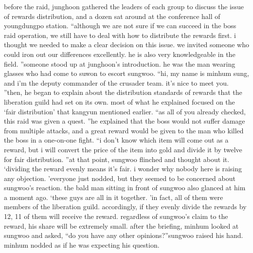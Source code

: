 before the raid, junghoon gathered the leaders of each group to discuss the issue of rewards distribution, and a dozen sat around at the conference hall of youngdungpo station.
“although we are not sure if we can succeed in the boss raid operation, we still have to deal with how to distribute the rewards first.
 i thought we needed to make a clear decision on this issue.
 we invited someone who could iron out our differences excellently.
 he is also very knowledgeable in the field.
”someone stood up at junghoon’s introduction.
 he was the man wearing glasses who had come to suwon to escort sungwoo.
“hi, my name is minhum sung, and i’m the deputy commander of the crusader team.
 it’s nice to meet you.
”then, he began to explain about the distribution standards of rewards that the liberation guild had set on its own.
 most of what he explained focused on the ‘fair distribution’ that kangyun mentioned earlier.
“as all of you already checked, this raid was given a quest.
”he explained that the boss would not suffer damage from multiple attacks, and a great reward would be given to the man who killed the boss in a one-on-one fight.
“i don’t know which item will come out as a reward, but i will convert the price of the item into gold and divide it by twelve for fair distribution.
”at that point, sungwoo flinched and thought about it.
‘dividing the reward evenly means it’s fair.
 i wonder why nobody here is raising any objection.
’everyone just nodded, but they seemed to be concerned about sungwoo’s reaction.
the bald man sitting in front of sungwoo also glanced at him a moment ago.
‘these guys are all in it together.
’in fact, all of them were members of the liberation guild.
 accordingly, if they evenly divide the rewards by 12, 11 of them will receive the reward.
 regardless of sungwoo’s claim to the reward, his share will be extremely small.
after the briefing, minhum looked at sungwoo and asked, “do you have any other opinions?”sungwoo raised his hand.
 minhum nodded as if he was expecting his question.


 